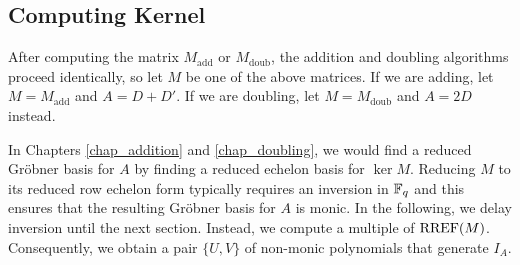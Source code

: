 
\subsection{Computing Kernel}

After computing the matrix $M_{\text{add}}$ or $M_{\text{doub}}$,
the addition and doubling algorithms proceed identically,
so let $M$ be one of the above matrices.
If we are adding, let $M = M_{\text{add}}$ and $A = D + D'$.
If we are doubling, let $M = M_{\text{doub}}$ and $A = 2D$ instead.

In Chapters \ref{chap_addition} and \ref{chap_doubling},
we would find a reduced Gr\"obner basis for $A$ by finding a reduced echelon basis for $\ker M$.
Reducing $M$ to its reduced row echelon form typically requires an inversion in $\mathbb{F}_q$
and this ensures that the resulting Gr\"obner basis for $A$ is monic.
In the following, we delay inversion until the next section.
Instead, we compute a multiple of $\operatorname{RREF}(M)$.
Consequently, we obtain a pair $\{U,V\}$ of non-monic polynomials that generate $I_A$.

